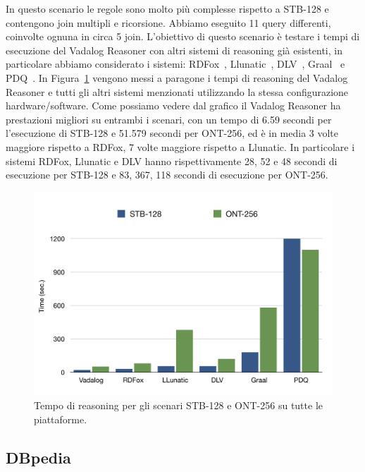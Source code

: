 In questo scenario le regole sono molto più complesse rispetto a STB-128 e contengono join multipli e ricorsione. Abbiamo eseguito 11 query differenti, coinvolte ognuna in circa 5 join. \newline
L'obiettivo di questo scenario è testare i tempi di esecuzione del Vadalog Reasoner con altri sistemi di reasoning già esistenti, in particolare abbiamo considerato i sistemi: RDFox~\cite{motik2014parallel}, Llunatic~\cite{geerts2014s}, DLV~\cite{leone2006dlv}, Graal~\cite{baget2015graal} e PDQ~\cite{benedikt2015querying}. \newline
In Figura~\ref{fig:ibenchgrafico} vengono messi a paragone i tempi di reasoning del Vadalog Reasoner e tutti gli altri sistemi menzionati utilizzando la stessa configurazione hardware/software. \newline
Come possiamo vedere dal grafico il Vadalog Reasoner ha prestazioni migliori su entrambi i scenari, con un tempo di 6.59 secondi per l'esecuzione di STB-128 e 51.579 secondi per ONT-256, ed è in media 3 volte maggiore rispetto a RDFox, 7 volte maggiore rispetto a Llunatic.\newline 
In particolare i sistemi RDFox, Llunatic e DLV hanno rispettivamente 28, 52 e 48 secondi di esecuzione per STB-128 e 83, 367, 118 secondi di esecuzione per ONT-256.
\begin{figure}[h]
	\centering
	\includegraphics[width=0.8\linewidth]{figure/ibenchgrafico}
	\caption{Tempo di reasoning per gli scenari STB-128 e ONT-256 su tutte le piattaforme.}
	\label{fig:ibenchgrafico}
\end{figure}

\subsection{DBpedia}

